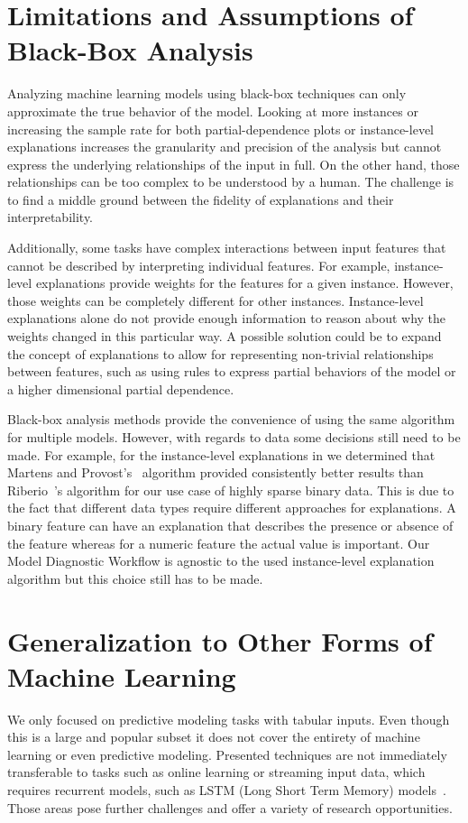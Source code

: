 \section{Limitations and Assumptions of Black-Box Analysis}
Analyzing machine learning models using black-box techniques can only approximate the true behavior of the model.
Looking at more instances or increasing the sample rate for both partial-dependence plots or instance-level explanations increases the granularity and precision of the analysis but cannot express the underlying relationships of the input in full.
On the other hand, those relationships can be too complex to be understood by a human.
The challenge is to find a middle ground between the fidelity of explanations and their interpretability.

Additionally, some tasks have complex interactions between input features that cannot be described by interpreting individual features.
For example, instance-level explanations provide weights for the features for a given instance.
However, those weights can be completely different for other instances.
Instance-level explanations alone do not provide enough information to reason about why the weights changed in this particular way.
A possible solution could be to expand the concept of explanations to allow for representing non-trivial relationships between features, such as using rules to express partial behaviors of the model or a higher dimensional partial dependence.

Black-box analysis methods provide the convenience of using the same algorithm for multiple models.
However, with regards to data some decisions still need to be made.
For example, for the instance-level explanations in  we determined that Martens and Provost's~\cite{Martens:2014:EDD:2600518.2600523} algorithm provided consistently better results than Riberio~\etal's\cite{DBLP:journals/corr/RibeiroSG16} algorithm for our use case of highly sparse binary data.
This is due to the fact that different data types require different approaches for explanations.
A binary feature can have an explanation that describes the presence or absence of the feature whereas for a numeric feature the actual value is important.
Our Model Diagnostic Workflow is agnostic to the used instance-level explanation algorithm but this choice still has to be made.

\section{Generalization to Other Forms of Machine Learning}
We only focused on predictive modeling tasks with tabular inputs.
Even though this is a large and popular subset it does not cover the entirety of machine learning or even predictive modeling.
Presented techniques are not immediately transferable to tasks such as online learning or streaming input data, which requires recurrent models, such as LSTM (Long Short Term Memory) models~\cite{Hochreiter:1997:LSM:1246443.1246450}.
Those areas pose further challenges and offer a variety of research opportunities.

